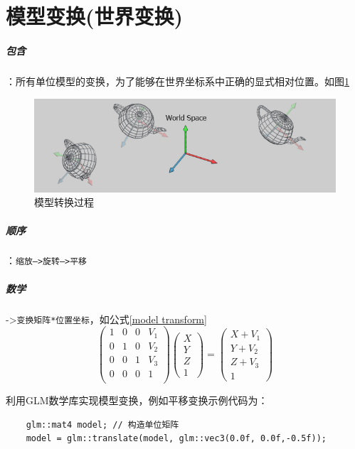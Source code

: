 \documentclass[UTF8,a4paper,8pt]{ctexbook}
\begin{document}
	\section{模型变换(世界变换)}
			\subparagraph{包含}：所有单位模型的变换，为了能够在世界坐标系中正确的显式相对位置。如图\ref{mxzh}
				\begin{figure}[htbp]
					\centering
					\includegraphics[scale = 0.7]{transferModel.png}
					\caption{模型转换过程}
					\label{mxzh}
				\end{figure}
			
			\subparagraph{顺序}：\verb|缩放–>旋转—>平移|
		
			\subparagraph{数学}->\verb|变换矩阵*位置坐标|，如公式\ref{model transform}
					\begin{equation}\label{model transform}
					\left(
					\begin{array}{cccc}
					1 & 0 & 0& V_1\\
					
					0 & 1 & 0& V_2\\
					
					0 & 0 & 1& V_3\\
					
					0 & 0 & 0& 1\\
					\end{array}
					\right)
					\left(
					\begin{array}{c}
					X\\ 
					Y\\
					Z\\
					1 
					\end{array}	
					\right) 
					=
					\left(
					\begin{array}{c}
					X+V_1\\ 
					Y+V_2\\
					Z+V_3\\
					1 
					\end{array}	
					\right)
					\end{equation}
		
		
			利用GLM数学库实现模型变换，例如平移变换示例代码为：
			\begin{lstlisting}
	glm::mat4 model; // 构造单位矩阵
	model = glm::translate(model, glm::vec3(0.0f, 0.0f,-0.5f));
			\end{lstlisting}
			
\end{document}

